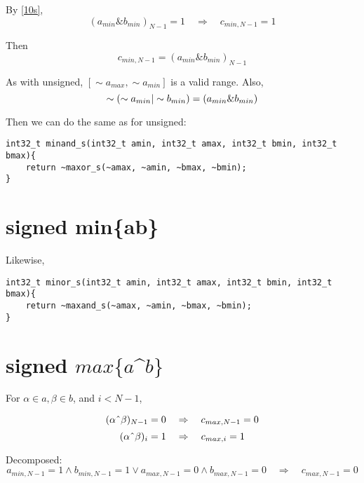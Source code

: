 \documentclass{article}
\begin{document}
By \eqref{10s},
\begin{equation*} 
(a_{min} \& b_{min})_{N-1} = 1 \quad \Rightarrow \quad c_{min, N-1} = 1
\end{equation*}

Then
\begin{equation*} 
c_{min,N-1} = (a_{min} \& b_{min})_{N-1} 
\end{equation*}

As with unsigned, $[\sim a_{max}, \sim a_{min}]$ is a valid range. Also,
\begin{equation*}
\sim (\sim a_{min} \text{\textbar} \sim b_{min}) = (a_{min} \& b_{min})
\end{equation*}

Then we can do the same as for unsigned:
\begin{lstlisting}
int32_t minand_s(int32_t amin, int32_t amax, int32_t bmin, int32_t bmax){
    return ~maxor_s(~amax, ~amin, ~bmax, ~bmin);
}
\end{lstlisting}

\section{signed min\{a\text{\textbar}b\}}

Likewise,
\begin{lstlisting}
int32_t minor_s(int32_t amin, int32_t amax, int32_t bmin, int32_t bmax){
    return ~maxand_s(~amax, ~amin, ~bmax, ~bmin);
}
\end{lstlisting}

\section{signed $max\{a$\^{}$b\}$}

For $\alpha \in a, \beta \in b$, and $i < N-1$,

\begin{equation} 
(\alpha \text{\^{}} \beta)_{N-1} = 0 \quad \Rightarrow \quad 
c_{max, N-1} = 0
\end{equation}
\begin{equation}
(\alpha\text{\^{}}\beta)_i = 1 
\quad \Rightarrow \quad 
c_{max,i} = 1
\end{equation}

Decomposed:
\begin{equation*}
a_{min,N-1} = 1 \wedge b_{min,N-1} = 1 \vee 
a_{max,N-1} = 0 \wedge b_{max,N-1} = 0
\quad \Rightarrow \quad 
c_{max,N-1} = 0
\end{equation*}
\end{document}
